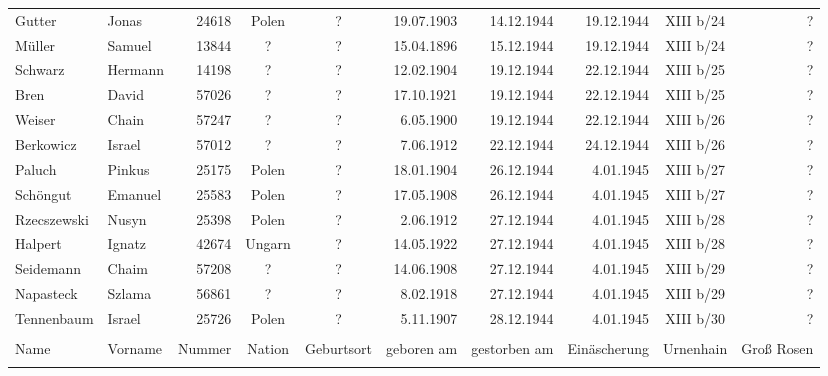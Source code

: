 \documentclass[a4paper,12pt,ngerman,
]{nisebook}
\begin{document}
\begin{tiny}
\begin{longtable}[l]{|l|l|r|c|c|r|r|r|c|r|}
Gutter  &  Jonas  & 24618 &  Polen  &  ?  & 19.07.1903 & 14.12.1944 & 19.12.1944 &  XIII b/24  &  ? \\[3pt]
Müller  &  Samuel  & 13844 &  ?  &  ?  & 15.04.1896 & 15.12.1944 & 19.12.1944 &  XIII b/24  &  ? \\[3pt]
Schwarz  &  Hermann  & 14198 &  ?  &  ?  & 12.02.1904 & 19.12.1944 & 22.12.1944 &  XIII b/25  &  ? \\[3pt]
Bren  &  David  & 57026 &  ?  &  ?  & 17.10.1921 & 19.12.1944 & 22.12.1944 &  XIII b/25  &  ? \\[3pt]
Weiser  &  Chain  & 57247 &  ?  &  ?  & 6.05.1900 & 19.12.1944 & 22.12.1944 &  XIII b/26  &  ? \\[3pt]
Berkowicz  &  Israel  & 57012 &  ?  &  ?  & 7.06.1912 & 22.12.1944 & 24.12.1944 &  XIII b/26  &  ? \\[3pt]
Paluch  &  Pinkus  & 25175 &  Polen  &  ?  & 18.01.1904 & 26.12.1944 & 4.01.1945 &  XIII b/27  &  ? \\[3pt]
Schöngut  &  Emanuel  & 25583 &  Polen  &  ?  & 17.05.1908 & 26.12.1944 & 4.01.1945 &  XIII b/27  &  ? \\[3pt]
Rzecszewski  &  Nusyn  & 25398 &  Polen  &  ?  & 2.06.1912 & 27.12.1944 & 4.01.1945 &  XIII b/28  &  ? \\[3pt]
Halpert  &  Ignatz  & 42674 &  Ungarn  &  ?  & 14.05.1922 & 27.12.1944 & 4.01.1945 &  XIII b/28  &  ? \\[3pt]
Seidemann  &  Chaim  & 57208 &  ?  &  ?  & 14.06.1908 & 27.12.1944 & 4.01.1945 &  XIII b/29  &  ? \\[3pt]
Napasteck  &  Szlama  & 56861 &  ?  &  ?  & 8.02.1918 & 27.12.1944 & 4.01.1945 &  XIII b/29  &  ? \\[3pt]
Tennenbaum  &  Israel  & 25726 &  Polen  &  ?  & 5.11.1907 & 28.12.1944 & 4.01.1945 &  XIII b/30  &  ? \\[3pt]

\hline\pagebreak\hline  & \\[-9pt]
Name  &  Vorname  &  Nummer  &  Nation  &  Geburtsort  &  geboren am  &  gestorben am  &  Einäscherung  &  Urnenhain  &  Groß Rosen \\[3pt]
\hline  & \\[-9pt]


\end{longtable}
\end{tiny}
\end{document}
